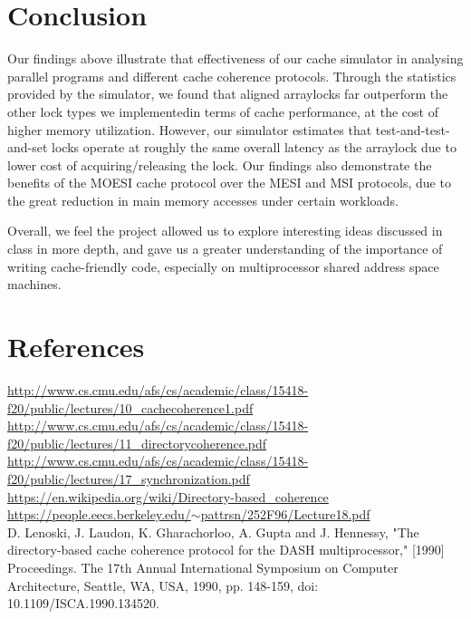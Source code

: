 \documentclass{article}
\begin{document}
\section{Conclusion}

Our findings above illustrate that effectiveness of our cache simulator in analysing parallel programs and different cache coherence protocols.  Through the statistics provided by the simulator, we found that aligned arraylocks far outperform the other lock types we implementedin terms of cache performance, at the cost of higher memory utilization.  However, our simulator estimates that test-and-test-and-set locks operate at roughly the same overall latency as the arraylock due to lower cost of acquiring/releasing the lock.  Our findings also demonstrate the benefits of the MOESI cache protocol over the MESI and MSI protocols, due to the great reduction in main memory accesses under certain workloads.

Overall, we feel the project allowed us to explore interesting ideas discussed in class in more depth, and gave us a greater understanding of the importance of writing cache-friendly code, especially on multiprocessor shared address space machines.


\section{References}
\href{http://www.cs.cmu.edu/afs/cs/academic/class/15418-f20/public/lectures/10\_cachecoherence1.pdf}{http://www.cs.cmu.edu/afs/cs/academic/class/15418-f20/public/lectures/10\_cachecoherence1.pdf} \\
\href{http://www.cs.cmu.edu/afs/cs/academic/class/15418-f20/public/lectures/11\_directorycoherence.pdf}{http://www.cs.cmu.edu/afs/cs/academic/class/15418-f20/public/lectures/11\_directorycoherence.pdf} \\
\href{http://www.cs.cmu.edu/afs/cs/academic/class/15418-f20/public/lectures/17\_synchronization.pdf}{http://www.cs.cmu.edu/afs/cs/academic/class/15418-f20/public/lectures/17\_synchronization.pdf} \\
\href{https://en.wikipedia.org/wiki/Directory-based\_coherence}{https://en.wikipedia.org/wiki/Directory-based\_coherence} \\
\href{https://people.eecs.berkeley.edu/~ pattrsn/252F96/Lecture18.pdf}{https://people.eecs.berkeley.edu/$\sim$pattrsn/252F96/Lecture18.pdf} \\

D. Lenoski, J. Laudon, K. Gharachorloo, A. Gupta and J. Hennessy, "The directory-based cache coherence protocol for the DASH multiprocessor," [1990] Proceedings. The 17th Annual International Symposium on Computer Architecture, Seattle, WA, USA, 1990, pp. 148-159, doi: 10.1109/ISCA.1990.134520.
\end{document}
